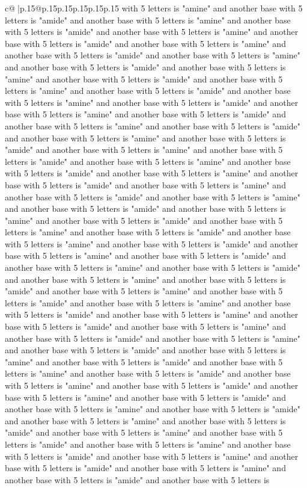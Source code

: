 \documentclass{article}
\begin{document}
{\begin{supertabular}{c@{$\;$}|p{.15\linewidth}@{}p{.15\linewidth}p{.15\linewidth}p{.15\linewidth}p{.15\linewidth}p{.15\linewidth}}
{{{with 5 letters is "amine" and another base with 5 letters is "amide" and another base with 5 letters is "amine" and another base with 5 letters is "amide" and another base with 5 letters is "amine" and another base with 5 letters is "amide" and another base with 5 letters is "amine" and another base with 5 letters is "amide" and another base with 5 letters is "amine" and another base with 5 letters is "amide" and another base with 5 letters is "amine" and another base with 5 letters is "amide" and another base with 5 letters is "amine" and another base with 5 letters is "amide" and another base with 5 letters is "amine" and another base with 5 letters is "amide" and another base with 5 letters is "amine" and another base with 5 letters is "amide" and another base with 5 letters is "amine" and another base with 5 letters is "amide" and another base with 5 letters is "amine" and another base with 5 letters is "amide" and another base with 5 letters is "amine" and another base with 5 letters is "amide" and another base with 5 letters is "amine" and another base with 5 letters is "amide" and another base with 5 letters is "amine" and another base with 5 letters is "amide" and another base with 5 letters is "amine" and another base with 5 letters is "amide" and another base with 5 letters is "amine" and another base with 5 letters is "amide" and another base with 5 letters is "amine" and another base with 5 letters is "amide" and another base with 5 letters is "amine" and another base with 5 letters is "amide" and another base with 5 letters is "amine" and another base with 5 letters is "amide" and another base with 5 letters is "amine" and another base with 5 letters is "amide" and another base with 5 letters is "amine" and another base with 5 letters is "amide" and another base with 5 letters is "amine" and another base with 5 letters is "amide" and another base with 5 letters is "amine" and another base with 5 letters is "amide" and another base with 5 letters is "amine" and another base with 5 letters is "amide" and another base with 5 letters is "amine" and another base with 5 letters is "amide" and another base with 5 letters is "amine" and another base with 5 letters is "amide" and another base with 5 letters is "amine" and another base with 5 letters is "amide" and another base with 5 letters is "amine" and another base with 5 letters is "amide" and another base with 5 letters is "amine" and another base with 5 letters is "amide" and another base with 5 letters is "amine" and another base with 5 letters is "amide" and another base with 5 letters is "amine" and another base with 5 letters is "amide" and another base with 5 letters is "amine" and another base with 5 letters is "amide" and another base with 5 letters is "amine" and another base with 5 letters is "amide" and another base with 5 letters is "amine" and another base with 5 letters is "amide" and another base with 5 letters is "amine" and another base with 5 letters is "amide" and another base with 5 letters is "amine" and another base with 5 letters is "amide" and another base with 5 letters is "amine" and another base with 5 letters is "amide" and another base with 5 letters is }}}
\end{supertabular}}
\end{document}
